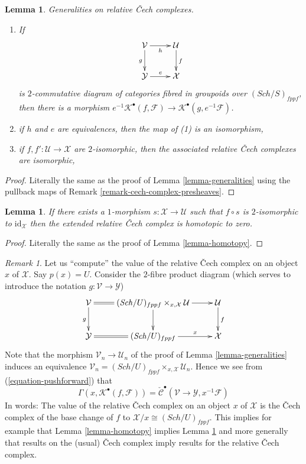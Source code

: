 \documentclass{stacks-project}
\theoremstyle{plain}
\newtheorem{lemma}[subsection]{Lemma}
\theoremstyle{definition}
\theoremstyle{remark}
\newtheorem{remark}[subsection]{Remark}
\numberwithin{equation}{subsection}
\def\Sch{\mathit{Sch}}
\begin{document}
\begin{lemma}
\label{lemma-generalities-sheafified}
Generalities on relative {\v C}ech complexes.
\begin{enumerate}
\item If
$$
\xymatrix{
\mathcal{V} \ar[d]_g \ar[r]_h & \mathcal{U} \ar[d]^f \\
\mathcal{Y} \ar[r]^e & \mathcal{X}
}
$$
is $2$-commutative diagram of categories fibred in groupoids over
$(\Sch/S)_{fppf}$, then there is a morphism
$e^{-1}\mathcal{K}^\bullet(f, \mathcal{F}) \to
\mathcal{K}^\bullet(g, e^{-1}\mathcal{F})$.
\item if $h$ and $e$ are equivalences, then the map of (1) is an isomorphism,
\item if $f, f' : \mathcal{U} \to \mathcal{X}$ are $2$-isomorphic, then
the associated relative {\v C}ech complexes are isomorphic,
\end{enumerate}
\end{lemma}

\begin{proof}
Literally the same as the proof of
Lemma \ref{lemma-generalities}
using the pullback maps of
Remark \ref{remark-cech-complex-presheaves}.
\end{proof}

\begin{lemma}
\label{lemma-homotopy-sheafified}
If there exists a $1$-morphism $s : \mathcal{X} \to \mathcal{U}$
such that $f \circ s$ is $2$-isomorphic to $\text{id}_\mathcal{X}$
then the extended relative {\v C}ech complex is homotopic to zero.
\end{lemma}

\begin{proof}
Literally the same as the proof of
Lemma \ref{lemma-homotopy}.
\end{proof}

\begin{remark}
\label{remark-cech-complex-sections}
Let us ``compute'' the value of the relative {\v C}ech complex on an
object $x$ of $\mathcal{X}$. Say $p(x) = U$.
Consider the $2$-fibre product diagram (which serves to introduce
the notation $g : \mathcal{V} \to \mathcal{Y}$)
$$
\xymatrix{
\mathcal{V} \ar@{=}[r] \ar[d]_g &
(\Sch/U)_{fppf} \times_{x, \mathcal{X}} \mathcal{U} \ar[r] \ar[d] &
\mathcal{U} \ar[d]^f \\
\mathcal{Y} \ar@{=}[r] &
(\Sch/U)_{fppf} \ar[r]^-x & \mathcal{X}
}
$$
Note that the morphism $\mathcal{V}_n \to \mathcal{U}_n$ of the proof of
Lemma \ref{lemma-generalities}
induces an equivalence
$\mathcal{V}_n =
(\Sch/U)_{fppf} \times_{x, \mathcal{X}} \mathcal{U}_n$.
Hence we see from
(\ref{equation-pushforward})
that
$$
\Gamma(x, \mathcal{K}^\bullet(f, \mathcal{F})) =
\check{\mathcal{C}}^\bullet(\mathcal{V} \to \mathcal{Y}, x^{-1}\mathcal{F})
$$
In words: The value of the relative {\v C}ech complex on an object $x$ of
$\mathcal{X}$ is the {\v C}ech complex of the base change of $f$ to
$\mathcal{X}/x \cong (\Sch/U)_{fppf}$. This implies for example that
Lemma \ref{lemma-homotopy}
implies
Lemma \ref{lemma-homotopy-sheafified}
and more generally that results on the (usual) {\v C}ech complex imply
results for the relative {\v C}ech complex.
\end{remark}
\end{document}
